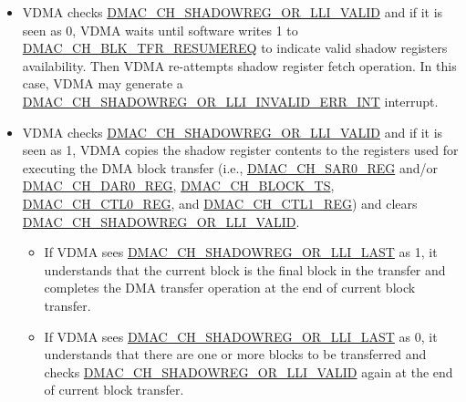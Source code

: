 \documentclass[main\_\_EN.tex]{subfiles}
\begin{document}
\begin{enumerate}
\begin{itemize}
\begin{itemize}
                \item When the source is a peripheral, obtaining data from the source requires waiting for a handshake with the source. When the destination is a peripheral, writing data to the destination requires waiting for a handshake with the destination.
            \end{itemize}

        \item VDMA checks \hyperref[fielddesc:DMACCHNSHADOWREGORLLIVALID]{DMAC\_CH\_SHADOWREG\_OR\_LLI\_VALID} and if it is seen as 0, VDMA waits until software writes 1 to \hyperref[fielddesc:DMACCHNBLKTFRRESUMEREQ]{DMAC\_CH\_BLK\_TFR\_RESUMEREQ} to indicate valid shadow registers availability. Then VDMA re-attempts shadow register fetch operation. In this case, VDMA may generate a \hyperref[int:DMACCHNSHADOWREGORLLIINVALIDERRINT]{DMAC\_CH\_SHADOWREG\_OR\_LLI\_INVALID\_ERR\_INT} interrupt.

        \item VDMA checks \hyperref[fielddesc:DMACCHNSHADOWREGORLLIVALID]{DMAC\_CH\_SHADOWREG\_OR\_LLI\_VALID} and if it is seen as 1, VDMA copies the shadow register contents to the registers used for executing the DMA block transfer (i.e., \hyperref[regdesc:DMACCHNSAR0REG]{DMAC\_CH\_SAR0\_REG} and/or \hyperref[regdesc:DMACCHNDAR0REG]{DMAC\_CH\_DAR0\_REG}, \hyperref[fielddesc:DMACCHNBLOCKTS]{DMAC\_CH\_BLOCK\_TS}, \hyperref[regdesc:DMACCHNCTL0REG]{DMAC\_CH\_CTL0\_REG}, and \hyperref[regdesc:DMACCHNCTL1REG]{DMAC\_CH\_CTL1\_REG}) and clears \hyperref[fielddesc:DMACCHNSHADOWREGORLLIVALID]{DMAC\_CH\_SHADOWREG\_OR\_LLI\_VALID}.

            \begin{itemize}
            \item If VDMA sees \hyperref[fielddesc:DMACCHNSHADOWREGORLLILAST]{DMAC\_CH\_SHADOWREG\_OR\_LLI\_LAST} as 1, it understands that the current block is the final block in the transfer and completes the DMA transfer operation at the end of current block transfer.
            \item If VDMA sees \hyperref[fielddesc:DMACCHNSHADOWREGORLLILAST]{DMAC\_CH\_SHADOWREG\_OR\_LLI\_LAST} as 0, it understands that there are one or more blocks to be transferred and checks \hyperref[fielddesc:DMACCHNSHADOWREGORLLIVALID]{DMAC\_CH\_SHADOWREG\_OR\_LLI\_VALID} again at the end of current block transfer.
        \end{itemize}
    \end{itemize}


\end{enumerate}
\end{document}
